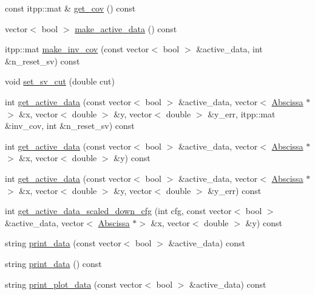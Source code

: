 \begin{DoxyCompactItemize}
\item 
const itpp\+::mat \& \mbox{\hyperlink{classData_a19b920edbea6526f6db747bfe1c4c1c2}{get\+\_\+cov}} () const
\item 
vector$<$ bool $>$ \mbox{\hyperlink{classData_af5d089365e8be78e4cd486bda87f37b4}{make\+\_\+active\+\_\+data}} () const
\item 
itpp\+::mat \mbox{\hyperlink{classData_a39cfb18f88b5b75d640404d87b428820}{make\+\_\+inv\+\_\+cov}} (const vector$<$ bool $>$ \&active\+\_\+data, int \&n\+\_\+reset\+\_\+sv) const
\item 
void \mbox{\hyperlink{classData_a8faffbd514fe8831470ce0e982c048da}{set\+\_\+sv\+\_\+cut}} (double cut)
\item 
int \mbox{\hyperlink{classData_acde259686a74799b2fea4d1383d43ec4}{get\+\_\+active\+\_\+data}} (const vector$<$ bool $>$ \&active\+\_\+data, vector$<$ \mbox{\hyperlink{classAbscissa}{Abscissa}} $\ast$$>$ \&x, vector$<$ double $>$ \&y, vector$<$ double $>$ \&y\+\_\+err, itpp\+::mat \&inv\+\_\+cov, int \&n\+\_\+reset\+\_\+sv) const
\item 
int \mbox{\hyperlink{classData_a0400209f4bebe1ba6128a11612677c24}{get\+\_\+active\+\_\+data}} (const vector$<$ bool $>$ \&active\+\_\+data, vector$<$ \mbox{\hyperlink{classAbscissa}{Abscissa}} $\ast$$>$ \&x, vector$<$ double $>$ \&y) const
\item 
int \mbox{\hyperlink{classData_aa57667ce832cbf712b9a77a70ccfdbac}{get\+\_\+active\+\_\+data}} (const vector$<$ bool $>$ \&active\+\_\+data, vector$<$ \mbox{\hyperlink{classAbscissa}{Abscissa}} $\ast$$>$ \&x, vector$<$ double $>$ \&y, vector$<$ double $>$ \&y\+\_\+err) const
\item 
int \mbox{\hyperlink{classData_a2852ff59adff1f77d3e0ce4c620fe501}{get\+\_\+active\+\_\+data\+\_\+scaled\+\_\+down\+\_\+cfg}} (int cfg, const vector$<$ bool $>$ \&active\+\_\+data, vector$<$ \mbox{\hyperlink{classAbscissa}{Abscissa}} $\ast$$>$ \&x, vector$<$ double $>$ \&y) const
\item 
string \mbox{\hyperlink{classData_a8663c7e41a90bdc730ff8b6cbe046c52}{print\+\_\+data}} (const vector$<$ bool $>$ \&active\+\_\+data) const
\item 
string \mbox{\hyperlink{classData_a255a7abe193d5dfbd77fb957942bda64}{print\+\_\+data}} () const
\item 
string \mbox{\hyperlink{classData_a9dd9812c56754c985d50e9a5fc855320}{print\+\_\+plot\+\_\+data}} (const vector$<$ bool $>$ \&active\+\_\+data) const
\end{DoxyCompactItemize}
